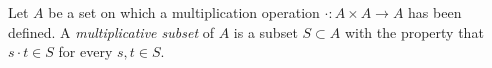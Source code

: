 \documentclass{article}
\begin{document}
Let $A$ be a set on which a multiplication operation $\cdot: A \times A \longrightarrow A$ has been defined. A {\em multiplicative subset} of $A$ is a subset $S \subset A$ with the property that $s \cdot t \in S$ for every $s,t \in S$.
\end{document}
